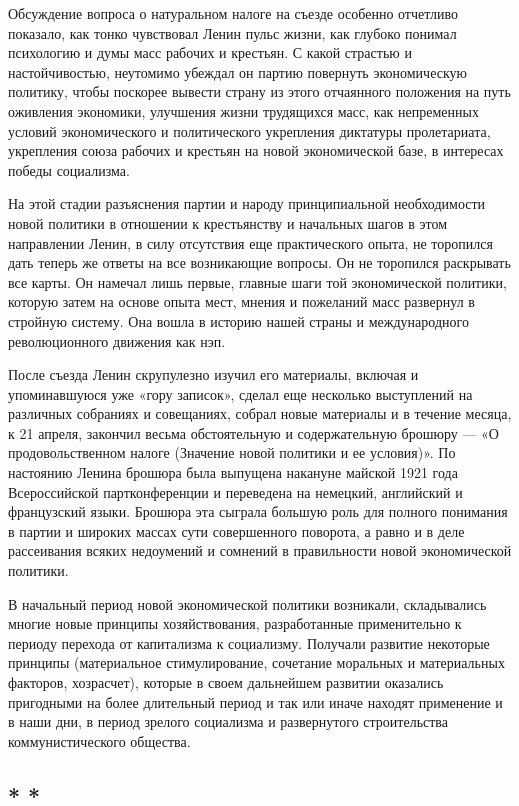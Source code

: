 \documentclass[12pt, a4paper, openany]{book}
\begin{document}
Обсуждение вопроса о натуральном налоге на съезде особенно отчетливо показало, как тонко чувствовал Ленин пульс жизни, как глубоко понимал психологию и думы масс рабочих и крестьян. С какой страстью и настойчивостью, неутомимо убеждал он партию повернуть экономическую политику, чтобы поскорее вывести страну из этого отчаянного положения на путь оживления экономики, улучшения жизни трудящихся масс, как непременных условий экономического и политического укрепления диктатуры пролетариата, укрепления союза рабочих и крестьян на новой экономической базе, в интересах победы социализма.

На этой стадии разъяснения партии и народу принципиальной необходимости новой политики в отношении к крестьянству и начальных шагов в этом направлении Ленин, в силу отсутствия еще практического опыта, не торопился дать теперь же ответы на все возникающие вопросы. Он не торопился раскрывать все карты. Он намечал лишь первые, главные шаги той экономической политики, которую затем на основе опыта мест, мнения и пожеланий масс развернул в стройную систему. Она вошла в историю нашей страны и международного революционного движения как нэп.

После съезда Ленин скрупулезно изучил его материалы, включая и упоминавшуюся уже «гору записок», сделал еще несколько выступлений на различных собраниях и совещаниях, собрал новые материалы и в течение месяца, к 21 апреля, закончил весьма обстоятельную и содержательную брошюру — «О продовольственном налоге (Значение новой политики и ее условия)». По настоянию Ленина брошюра была выпущена накануне майской 1921 года Всероссийской партконференции и переведена на немецкий, английский и французский языки. Брошюра эта сыграла большую роль для полного понимания в партии и широких массах сути совершенного поворота, а равно и в деле рассеивания всяких недоумений и сомнений в правильности новой экономической политики.

В начальный период новой экономической политики возникали, складывались многие новые принципы хозяйствования, разработанные применительно к периоду перехода от капитализма к социализму. Получали развитие некоторые принципы (материальное стимулирование, сочетание моральных и материальных факторов, хозрасчет), которые в своем дальнейшем развитии оказались пригодными на более длительный период и так или иначе находят применение и в наши дни, в период зрелого социализма и развернутого строительства коммунистического общества.

\subsection*{\center * * *}
\end{document}
